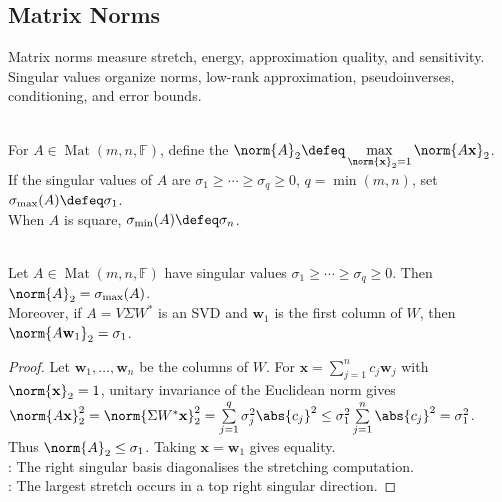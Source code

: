 \subsection{Matrix Norms}

%

Matrix norms measure stretch, energy, approximation quality, and sensitivity. Singular values organize norms, low-rank approximation, pseudoinverses, conditioning, and error bounds.

\begin{definition} \label{def:spectral-norm-and-singular-extremes} \\
For $A\in\operatorname{Mat}(m,n,\mathbb{F})$, define the  $\norm{A}_2\defeq\max\limits_{\norm{\mathbf{x}}_2=1}\norm{A\mathbf{x}}_2$.\\
If the singular values of $A$ are $\sigma_1\geq\cdots\geq\sigma_q\geq0$, $q=\min(m,n)$, set $\sigma_{\max}(A)\defeq\sigma_1$.\\
When $A$ is square, $\sigma_{\min}(A)\defeq\sigma_n$.
\end{definition}

\begin{theorem} \label{thm:spectral-norm-largest-singular-value} \\
Let $A\in\operatorname{Mat}(m,n,\mathbb{F})$ have singular values $\sigma_1\geq\cdots\geq\sigma_q\geq0$. Then $\norm{A}_2=\sigma_{\max}(A)$.\\
Moreover, if $A=V\Sigma W^*$ is an SVD and $\mathbf{w}_1$ is the first column of $W$, then $\norm{A\mathbf{w}_1}_2=\sigma_1$.
\begin{proof}
Let $\mathbf{w}_1,\ldots,\mathbf{w}_n$ be the columns of $W$. For $\mathbf{x}=\sum_{j=1}^{n}c_j\mathbf{w}_j$ with $\norm{\mathbf{x}}_2=1$, unitary invariance of the Euclidean norm gives $\norm{A\mathbf{x}}_2^2 =\norm{\Sigma W^*\mathbf{x}}_2^2 =\sum\limits_{j=1}^{q}\sigma_j^2\abs{c_j}^2 \leq \sigma_1^2\sum\limits_{j=1}^{n}\abs{c_j}^2 =\sigma_1^2$.\\
Thus $\norm{A}_2\leq\sigma_1$. Taking $\mathbf{x}=\mathbf{w}_1$ gives equality.\\
: The right singular basis diagonalises the stretching computation.\\
: The largest stretch occurs in a top right singular direction.
\end{proof}
\end{theorem}

